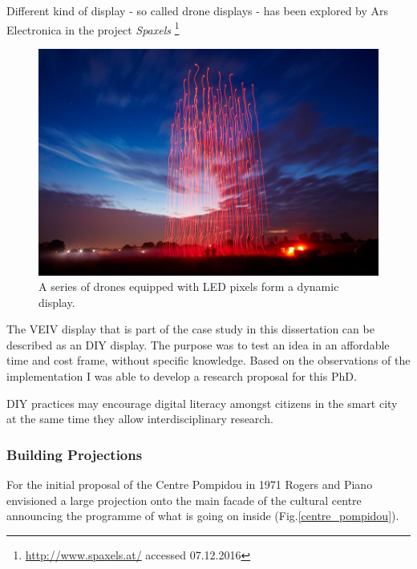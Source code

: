 Different kind of display - so called drone displays - has been explored by Ars Electronica in the project \textit{Spaxels}   \footnote{\url{http://www.spaxels.at/} accessed 07.12.2016}


\begin{figure}[htp]
\centering
\includegraphics[width=\textwidth]{Illustrations/spaxels.jpg}
\caption{A series of drones equipped with LED pixels form a dynamic display.}
\label{spaxels}
\end{figure}


The VEIV display that is part of the case study in this dissertation can be described as an DIY display. The purpose was to test an idea in an affordable time and cost frame, without specific knowledge. Based on the observations of the implementation I was able to develop a research proposal for this PhD.

DIY practices may encourage digital literacy amongst citizens in the smart city at the same time they allow interdisciplinary research. 



\subsubsection{Building Projections}

For the initial proposal of the Centre Pompidou  in 1971 Rogers and Piano envisioned a large projection onto the main facade of the cultural centre announcing the programme of what is going on inside (Fig.\ref{centre_pompidou}).  

